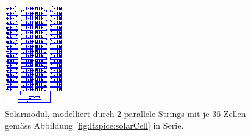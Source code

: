 \begin{figure}[h!tb]
    \centering
    \includegraphics[width=\textwidth]{images/ltspice/module-72cells.eps}
    \caption{%
        Solarmodul,  modelliert durch  2 parallele  Strings mit  je 36  Zellen
        gem\"ass Abbildung \ref{fig:ltspice:solarCell} in Serie.
    }
    \label{fig:ltspice:solarmodul:cellBased}
\end{figure}
